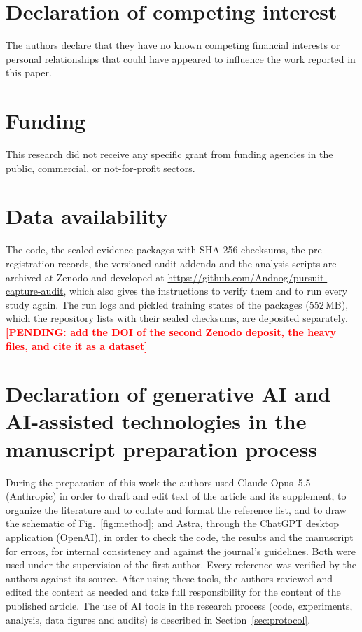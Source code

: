 \documentclass[5p,twocolumn]{elsarticle}
\newcommand{\pending}[1]{\textcolor{red}{\textbf{[PENDING: #1]}}}
\begin{document}
\section*{Declaration of competing interest}
The authors declare that they have no known competing financial interests or personal relationships that could have
appeared to influence the work reported in this paper.

\section*{Funding}
This research did not receive any specific grant from funding agencies in the public, commercial, or not-for-profit
sectors.

\section*{Data availability}
The code, the sealed evidence packages with SHA-256 checksums, the pre-registration records, the versioned audit
addenda and the analysis scripts are archived at Zenodo \cite{noguera2026code} and developed at
\url{https://github.com/Andnog/pursuit-capture-audit}, which also gives the instructions to verify them and to run
every study again. The run logs and pickled training states of the packages (552\,MB), which the repository lists
with their sealed checksums, are deposited separately. \pending{add the DOI of the second Zenodo deposit, the heavy
files, and cite it as a dataset}

\section*{Declaration of generative AI and AI-assisted technologies in the manuscript preparation process}
During the preparation of this work the authors used Claude Opus~5.5 (Anthropic) in order to draft and edit text of
the article and its supplement, to organize the literature and to collate and format the reference list, and to draw
the schematic of Fig.~\ref{fig:method}; and Astra, through the ChatGPT desktop application (OpenAI), in order to
check the code, the results and the manuscript for errors, for internal consistency and against the journal's
guidelines. Both were used under the supervision of the first author. Every reference was verified by the authors
against its source. After using these tools, the
authors reviewed and edited the content as needed and take full responsibility for the content of the published
article. The use of AI tools in the research process (code, experiments, analysis, data figures and audits) is
described in Section~\ref{sec:protocol}.



\end{document}
